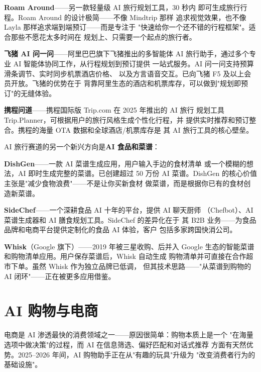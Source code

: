 \textbf{Roam Around}——另一款轻量级 AI 旅行规划工具，30 秒内
即可生成旅行行程。Roam Around 的设计极简——不像 Mindtrip 那样
追求视觉效果，也不像 Layla 那样追求端到端预订——而是专注于
"快速给你一个还不错的行程框架"。适合那些不愿花太多时间在
规划上、只需要一个起点的旅行者。

\textbf{飞猪 AI 问一问}——阿里巴巴旗下飞猪推出的多智能体 AI
旅行助手，通过多个专业 AI 智能体协同工作，从行程规划到预订提供
一站式服务。AI 问一问支持预算滑条调节、实时同步机票酒店价格、
以及方言语音交互。已向飞猪 F5 及以上会员开放。飞猪的优势在于
背靠阿里生态的酒店和机票库存，可以做到"规划即预订"的无缝体验。

\textbf{携程问道}——携程国际版 Trip.com 在 2025 年推出的 AI 旅行
规划工具 Trip.Planner，可根据用户的旅行风格生成个性化行程，并
提供实时推荐和预订整合。携程的海量 OTA 数据和全球酒店/机票库存是
其 AI 旅行工具的核心壁垒。

AI 旅行赛道的另一个新兴方向是\textbf{AI 食品和菜谱}：

\textbf{DishGen}——一款 AI 菜谱生成应用，用户输入手边的食材清单
或一个模糊的想法，AI 即时生成完整的菜谱。已创建超过 50 万份 AI
菜谱。DishGen 的核心价值主张是"减少食物浪费"——不是让你买新食材
做菜谱，而是根据你已有的食材创造新菜谱。

\textbf{SideChef}——一个深耕食品 AI 十年的平台，提供 AI 聊天厨师
（Chefbot）、AI 菜谱生成器和 AI 膳食规划工具。SideChef 的差异化在于
其 B2B 业务——为食品品牌和电商平台提供定制化的食品 AI 体验，客户
包括多家跨国快消公司。

\textbf{Whisk}（Google 旗下）——2019 年被三星收购、后并入 Google
生态的智能菜谱和购物清单应用。用户保存菜谱后，Whisk 自动生成
购物清单并可直接在合作超市下单。虽然 Whisk 作为独立品牌已低调，
但其技术思路——"从菜谱到购物的 AI 闭环"——正在被更多应用借鉴。



\section{AI 购物与电商}
\label{sec:life-shopping}

电商是 AI 渗透最快的消费领域之一——原因很简单：购物本质上是一个
"在海量选项中做决策"的过程，而 AI 在信息筛选、偏好匹配和对话式推荐
方面有天然优势。2025--2026 年间，AI 购物助手正在从"有趣的玩具"升级为
"改变消费者行为的基础设施"。

